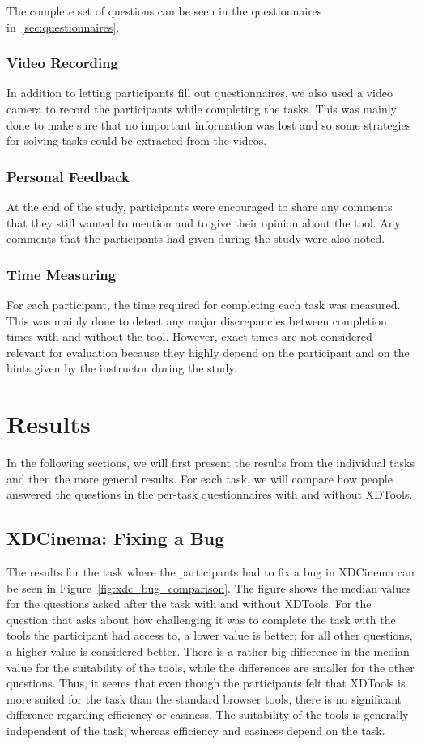 The complete set of questions can be seen in the questionnaires in~\ref{sec:questionnaires}.

\subsubsection{Video Recording}
In addition to letting participants fill out questionnaires, we also used a video camera to record the participants while completing the tasks. This was mainly done to make sure that no important information was lost and so some strategies for solving tasks could be extracted from the videos. 

\subsubsection{Personal Feedback}
At the end of the study, participants were encouraged to share any comments that they still wanted to mention and to give their opinion about the tool. Any comments that the participants had given during the study were also noted.

\subsubsection{Time Measuring}
For each participant, the time required for completing each task was measured. This was mainly done to detect any major discrepancies between completion times with and without the tool. However, exact times are not considered relevant for evaluation because they highly depend on the participant and on the hints given by the instructor during the study.

\section{Results}

In the following sections, we will first present the results from the individual tasks and then the more general results. For each task, we will compare how people answered the questions in the per-task questionnaires with and without XDTools. 

\subsection{XDCinema: Fixing a Bug}

The results for the task where the participants had to fix a bug in XDCinema can be seen in Figure~\ref{fig:xdc_bug_comparison}. The figure shows the median values for the questions asked after the task with and without XDTools. For the question that asks about how challenging it was to complete the task with the tools the participant had access to, a lower value is better; for all other questions, a higher value is considered better. There is a rather big difference in the median value for the suitability of the tools, while the differences are smaller for the other questions. Thus, it seems that even though the participants felt that XDTools is more suited for the task than the standard browser tools, there is no significant difference regarding efficiency or easiness. The suitability of the tools is generally independent of the task, whereas efficiency and easiness depend on the task. 

